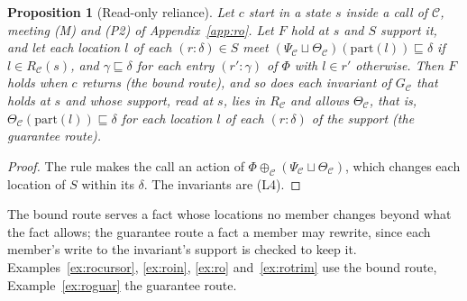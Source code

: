 \documentclass[10pt,a4paper]{article}
\newtheorem{proposition}[theorem]{Proposition}
\theoremstyle{definition}
\theoremstyle{remark}
\newcommand{\cC}{\mathcal{C}}
\begin{document}
\begin{proposition}[Read-only reliance]\label{prop:rorely}
Let $c$ start in a state $s$ inside a call of $\cC$, meeting (M) and
(P2) of Appendix~\ref{app:ro}. Let $F$ hold at $s$ and $S$ support it,
and let each location $l$ of each $(r:\delta)\in S$ meet
$(\Psi_\cC\sqcup\Theta_\cC)(\mathrm{part}(l))\sqsubseteq\delta$ if
$l\in R_\cC(s)$, and $\gamma\sqsubseteq\delta$ for each entry
$(r':\gamma)$ of $\Phi$ with $l\in r'$ otherwise. Then $F$ holds when
$c$ returns (the \emph{bound} route), and so does each invariant of
$G_\cC$ that holds at $s$ and whose support, read at $s$, lies in
$R_\cC$ and allows $\Theta_\cC$, that is,
$\Theta_\cC(\mathrm{part}(l))\sqsubseteq\delta$ for each location $l$ of
each $(r:\delta)$ of the support (the \emph{guarantee} route).
\end{proposition}
\begin{proof}
The rule makes the call an action of $\Phi\oplus_\cC(\Psi_\cC\sqcup\Theta_\cC)$,
which changes each location of $S$ within its $\delta$. The invariants
are (L4).
\end{proof}

\noindent
The bound route serves a fact whose locations no member changes beyond
what the fact allows; the guarantee route a fact a member may rewrite,
since each member's write to the invariant's support is checked to keep
it. Examples~\ref{ex:rocursor}, \ref{ex:roin}, \ref{ex:ro}
and~\ref{ex:rotrim} use the bound route, Example~\ref{ex:roguar} the
guarantee route.
\end{document}

